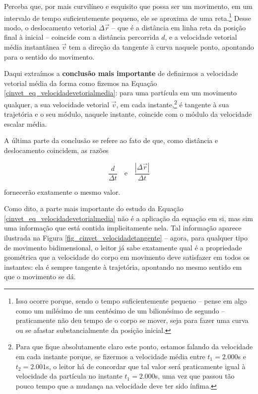 \begin{enumerate}
     Perceba que, por mais curvilíneo e esquisito que possa ser um movimento, em um intervalo de tempo suficientemente pequeno, ele se aproxima de uma reta.\footnote{Isso ocorre porque, sendo o tempo suficientemente pequeno -- pense em algo como um milésimo de um centésimo de um bilionésimo de segundo -- praticamente não deu tempo de o corpo se mover, seja para fazer uma curva ou se afastar substancialmente da posição inicial.} Desse modo, o deslocamento vetorial $\Delta \vec{r}$ -- que é a distância em linha reta da posição final à inicial -- coincide com a distância percorrida $d$, e a velocidade vetorial média instantânea $\vec{v}$ tem a direção da tangente à curva naquele ponto, apontando para o sentido do movimento.

     Daqui extraímos a \textbf{conclusão mais importante} de definirmos a velocidade vetorial média da forma como fizemos na Equação \eqref{cinvet_eq_velocidadevetorialmedia}: para uma partícula em um movimento qualquer, a sua velocidade vetorial $\vec{v}$, em cada instante,\footnote{Para que fique absolutamente claro este ponto, estamos falando da velocidade em cada instante porque, se fizermos a velocidade média entre $t_1=2.000$s e $t_2=2.001$s, o leitor há de concordar que tal valor será praticamente igual à velocidade da partícula no instante $t_1=2.000$s, uma vez que passou tão pouco tempo que a mudança na velocidade deve ter sido ínfima.} é tangente à sua trajetória e o seu módulo, naquele instante, coincide com o módulo da velocidade escalar média.

     
     A última parte da conclusão se refere ao fato de que, como distância e deslocamento coincidem, as razões
     
     
     $$ \dfrac{d}{\Delta t} \quad \text{e} \quad \dfrac{|\Delta \vec{r}|}{\Delta t}$$

     \noindent fornecerão exatamente o mesmo valor.
     

    
\end{enumerate}

Como dito, a parte mais importante do estudo da Equação \eqref{cinvet_eq_velocidadevetorialmedia} não é a aplicação da equação em si, mas sim uma informação que está contida implicitamente nela. Tal informação aparece ilustrada na Figura \ref{fig_cinvet_velocidadetangente} -- agora, para qualquer tipo de movimento bidimensional, o leitor já sabe exatamente qual é a propriedade geométrica que a velocidade do corpo em movimento deve satisfazer em todos os instantes: ela é sempre tangente à trajetória, apontando no mesmo sentido em que o movimento se dá.


